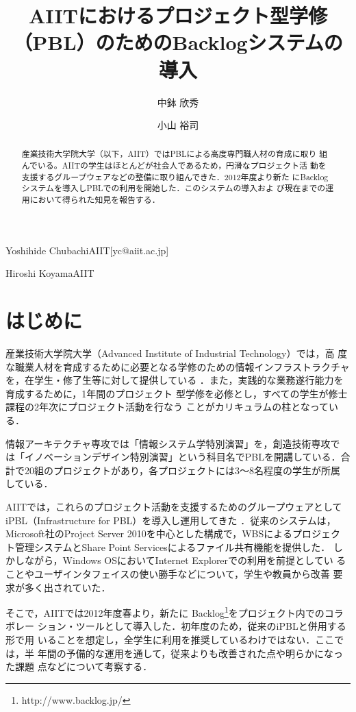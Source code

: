\documentclass[submit,techreq,noauthor]{ipsj}
\begin{document}
\title{AIITにおけるプロジェクト型学修（PBL）のためのBacklogシステムの導入}
\author{中鉢 欣秀}{Yoshihide Chubachi}{AIIT}[yc@aiit.ac.jp]
\author{小山 裕司}{Hiroshi Koyama}{AIIT}

\begin{abstract}
 産業技術大学院大学（以下，AIIT）ではPBLによる高度専門職人材の育成に取り
 組んでいる。AIITの学生はほとんどが社会人であるため，円滑なプロジェクト活
 動を支援するグループウェアなどの整備に取り組んできた．2012年度より新た
 にBacklogシステムを導入しPBLでの利用を開始した．このシステムの導入およ
 び現在までの運用において得られた知見を報告する．
\end{abstract}

\maketitle

\section{はじめに}

産業技術大学院大学（Advanced Institute of Industrial Technology）では，高
度な職業人材を育成するために必要となる学修のための情報インフラストラクチャ
を，在学生・修了生等に対して提供している
\cite{中鉢欣秀:2012-03-15, 小山裕司:2011, 石島辰太郎:2010, 中鉢欣秀:2010}
．また，実践的な業務遂行能力を育成するために，1年間のプロジェクト
型学修を必修とし，すべての学生が修士課程の2年次にプロジェクト活動を行なう
ことがカリキュラムの柱となっている\cite{加藤由花:2009, 戸沢義夫:2007-08-23}．

情報アーキテクチャ専攻では「情報システム学特別演習」を，創造技術専攻で
は「イノベーションデザイン特別演習」という科目名でPBLを開講している．合
計で20組のプロジェクトがあり，各プロジェクトには3〜8名程度の学生が所属
している．

AIITでは，これらのプロジェクト活動を支援するためのグループウェアとして
iPBL（Infrastructure for PBL）を導入し運用してきた
\cite{chubachi:2010:pbl, 中鉢欣秀:2009-05}．従来のシステムは，
Microsoft社のProject Server 2010を中心とした構成で，WBSによるプロジェク
ト管理システムとShare Point Servicesによるファイル共有機能を提供した．
しかしながら，Windows OSにおいてInternet Explorerでの利用を前提としてい
ることやユーザインタフェイスの使い勝手などについて，学生や教員から改善
要求が多く出されていた．

そこで，AIITでは2012年度春より，新たに
Backlog\footnote{http://www.backlog.jp/}をプロジェクト内でのコラボレー
ション・ツールとして導入した．初年度のため，従来のiPBLと併用する形で用
いることを想定し，全学生に利用を推奨しているわけではない．ここでは，半
年間の予備的な運用を通して，従来よりも改善された点や明らかになった課題
点などについて考察する．
\end{document}
